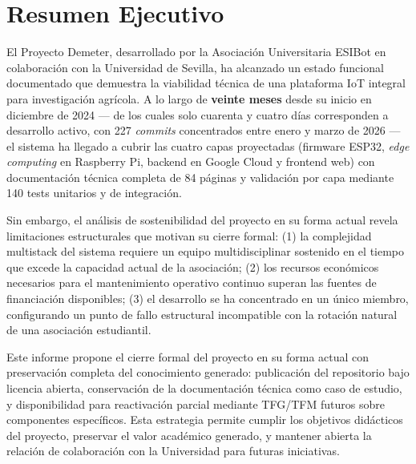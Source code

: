 \chapter*{Resumen Ejecutivo}

El Proyecto Demeter, desarrollado por la Asociaci\'on Universitaria ESIBot
en colaboraci\'on con la Universidad de Sevilla, ha alcanzado un estado
funcional documentado que demuestra la viabilidad t\'ecnica de una
plataforma IoT integral para investigaci\'on agr\'icola. A lo largo de
\textbf{veinte meses} desde su inicio en diciembre de 2024 --- de los
cuales solo cuarenta y cuatro d\'ias corresponden a desarrollo activo,
con 227 \textit{commits} concentrados entre enero y marzo de 2026 ---
el sistema ha llegado a cubrir las cuatro capas proyectadas
(firmware ESP32, \textit{edge computing} en Raspberry Pi, backend en
Google Cloud y frontend web) con documentaci\'on t\'ecnica completa de
84 p\'aginas y validaci\'on por capa mediante 140 tests unitarios y de
integraci\'on.

Sin embargo, el an\'alisis de sostenibilidad del proyecto en su forma
actual revela limitaciones estructurales que motivan su cierre formal:
(1) la complejidad multistack del sistema requiere un equipo
multidisciplinar sostenido en el tiempo que excede la capacidad actual
de la asociaci\'on; (2) los recursos econ\'omicos necesarios para el
mantenimiento operativo continuo superan las fuentes de financiaci\'on
disponibles; (3) el desarrollo se ha concentrado en un \'unico miembro,
configurando un punto de fallo estructural incompatible con la rotaci\'on
natural de una asociaci\'on estudiantil.

Este informe propone el cierre formal del proyecto en su forma actual
con preservaci\'on completa del conocimiento generado: publicaci\'on del
repositorio bajo licencia abierta, conservaci\'on de la documentaci\'on
t\'ecnica como caso de estudio, y disponibilidad para reactivaci\'on
parcial mediante TFG/TFM futuros sobre componentes espec\'ificos. Esta
estrategia permite cumplir los objetivos did\'acticos del proyecto,
preservar el valor acad\'emico generado, y mantener abierta la relaci\'on
de colaboraci\'on con la Universidad para futuras iniciativas.
